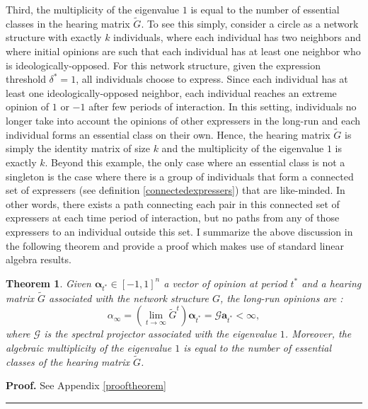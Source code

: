 \documentclass{article}
\newtheorem{theorem}{Theorem}
\newenvironment{proof}[1][Proof]{\textbf{#1.} }{\ \rule{0.5em}{0.5em}}
\begin{document}
Third, the multiplicity of the eigenvalue $1$ is equal to the number of essential classes in the hearing matrix $\tilde{G}$. To see this simply, consider a circle as a network structure with exactly $k$ individuals, where each individual has two neighbors and where initial opinions are such that each individual has at least one neighbor who is ideologically-opposed. For this network structure, given the expression threshold $\delta^{*}=1$, all individuals choose to express. Since each individual has at least one ideologically-opposed neighbor, each individual reaches an extreme opinion of $1$ or $-1$ after few periods of interaction. In this setting, individuals no longer take into account the opinions of other expressers in the long-run and each individual forms an essential class on their own. Hence, the hearing matrix $\tilde{G}$ is simply the identity matrix of size $k$ and the multiplicity of the eigenvalue $1$ is exactly $k$. Beyond this example, the only case where an essential class is not a singleton is the case where there is a group of individuals that form a connected set of expressers (see definition \ref{connectedexpressers}) that are like-minded. In other words, there exists a path connecting each pair in this connected set of expressers at each time period of interaction, but no paths from any of those expressers to an individual outside this set. I summarize the above discussion in the following theorem and provide a proof which makes use of standard linear algebra results.  
\begin{theorem}
Given $\mathbf{\alpha}_{t^{*}} \in [-1,1]^n$ a vector of opinion at period $t^{*}$ and a hearing matrix $\tilde{G}$ associated with the network structure $G$, the long-run opinions are : 
$$ \alpha_{\infty} = ( \lim_{t \rightarrow \infty} \tilde{G}^t ) \mathbf{\alpha}_{t^{*}} = \mathcal{G} \mathbf{a}_{t^{*}} < \infty,$$ 
where $\mathcal{G}$ is the spectral projector associated with the eigenvalue $1$. Moreover, the algebraic multiplicity of the eigenvalue $1$ is equal to the number of essential classes of the hearing matrix $\tilde{G}$. \label{theorem}
\end{theorem}
\noindent \begin{proof} See Appendix \ref{prooftheorem} \end{proof}
\end{document}
